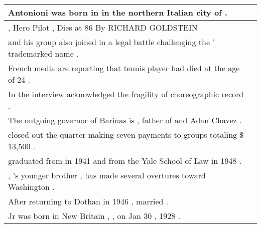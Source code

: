 \begin{longtable}{p{} P{1,3cm} }
\hline
{}  {Antonioni was born in \underline{} in the northern Italian city of \underline{} .} &    \\ 
\hline
{}  {\underline{} , Hero Pilot , Dies at 86 By RICHARD GOLDSTEIN} &    \\ 
\hline
{}  {\underline{} and his group also joined in a legal battle challenging the \underline{} ' trademarked name .} &    \\ 
\hline
{}  {French media are reporting that \underline{} tennis player \underline{} had died at the age of 24 .} &    \\ 
\hline
{}  {In the interview \underline{} acknowledged the fragility of \underline{} choreographic record .} &    \\ 
\hline
{}  {The outgoing governor of Barinas is \underline{} , father of \underline{} and Adan Chavez .} &    \\ 
\hline
{}  {\underline{} closed out the quarter making seven payments to \underline{} groups totaling \$ 13,500 .} &    \\ 
\hline
{}  {\underline{} graduated from \underline{} in 1941 and from the Yale School of Law in 1948 .} &    \\ 
\hline
{}  {\underline{} , \underline{} 's younger brother , has made several overtures toward Washington .} &    \\ 
\hline
{}  {After returning to Dothan in 1946 , \underline{} married \underline{} .} &    \\ 
\hline
{}  {\underline{} Jr was born in New Britain , \underline{} , on Jan 30 , 1928 .} &    \\ 

\end{longtable}

